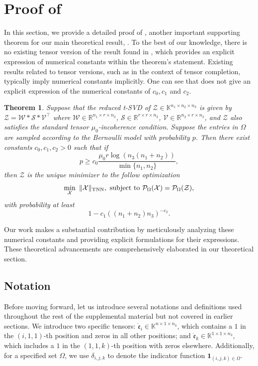 \documentclass[twoside,12pt]{article}
\newtheorem{theorem}{Theorem}
\newcommand{\TNN}{\textnormal{TNN}}
\def\dme{{\dot{\mathfrak{e}}}}
\def\mrme{{\mathring{\mathfrak{e}}}}
\begin{document}
\section{Proof of  }
In this section, we provide a detailed proof of ,  another important supporting theorem for our main theoretical result, .
 To the best of our knowledge, there is no existing tensor version of the result found in \citep[Theorem 1.1]{recht2011simpler}, which provides an explicit expression of numerical constants within the theorem's statement.  Existing results related to tensor versions, such as \citep[Theorem 3.1]{zhang2017exact} in the context of tensor completion, typically imply numerical constants implicitly. One can see that \citep[Theorem 3.1]{zhang2017exact} does not give an explicit expression of the numerical constants of $c_0, c_1$ and $c_2$. 
\begin{theorem}{\citep[Theorem 3.1]{zhang2017exact}}\label{thm2}
 Suppose that the reduced t-SVD of \( \mathcal{Z}\in\mathbb{K}^{n_1\times n_2\times n_3} \)   is given by \( \mathcal{Z} = \mathcal{W} * \mathcal{S} * \mathcal{V}^\top \) where \( \mathcal{W} \in \mathbb{R}^{n_1 \times r \times n_3} \), \( \mathcal{S} \in \mathbb{R}^{r \times r \times n_3} \),  \( \mathcal{V} \in \mathbb{R}^{n_2 \times r \times n_3} \), and \( \mathcal{Z} \) also satisfies the standard tensor $\mu_0$-incoherence condition. Suppose the entries in $\Omega$ are sampled according to the Bernoulli model with probability $p$. Then there exist constants \( c_0, c_1, c_2 > 0 \) such that if
\[
p \geq c_0 \frac{\mu_0 r \log(n_3(n_1 + n_2))}{\min\{n_1, n_2\}},
\]
then \( \mathcal{Z} \) is the unique minimizer to the follow optimization 
\[
\min_{\mathcal{X}}~
 \|\mathcal{X}\|_{\TNN},~ \text{subject to }
 \mathcal{P}_{\Omega}(\mathcal{X}) = \mathcal{P}_{\Omega}(\mathcal{Z}),
\]
with probability at least
\[
1 - c_1((n_1 + n_2)n_3)^{-c_2}.
\]
\end{theorem}
Our work makes a substantial contribution by meticulously analyzing these numerical constants and providing explicit formulations for their expressions. These theoretical advancements are comprehensively elaborated in our theoretical section.
\subsection{Notation}
Before moving forward, let us introduce several notations and definitions used throughout the rest of the supplemental material but not covered in earlier sections. We introduce two specific tensors: $\mrme_i \in \mathbb{K}^{n \times 1 \times n_3}$, which contains a $1$ in the $(i,1,1)$-th position and zeros in all other positions; and $\dme_k \in \mathbb{K}^{1 \times 1 \times n_3}$, which includes a $1$ in the $(1,1,k)$-th position with zeros elsewhere. Additionally, for a specified set $\Omega$, we use $\delta_{i,j,k}$ to denote the indicator function $\textbf{1}_{(i,j,k)\in \Omega}$.
\end{document}
